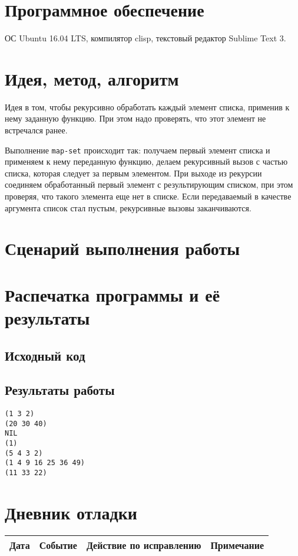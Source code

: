 \documentclass[12pt]{article}
\begin{document}
\section{Программное обеспечение}
ОС Ubuntu 16.04 LTS, компилятор clisp, текстовый редактор Sublime Text 3.

\section{Идея, метод, алгоритм}
Идея в том, чтобы рекурсивно обработать каждый элемент списка, применив к нему заданную функцию. При этом надо проверять, что этот элемент не встречался ранее.

Выполнение {\tt map-set} происходит так: получаем первый элемент списка и применяем к нему переданную функцию, делаем рекурсивный вызов с частью списка, которая следует за первым элементом. При выходе из рекурсии соединяем обработанный первый элемент с результирующим списком, при этом проверяя, что такого элемента еще нет в списке. Если передаваемый в качестве аргумента список стал пустым, рекурсивные вызовы заканчиваются.

\section{Сценарий выполнения работы}

\section{Распечатка программы и её результаты}

\subsection{Исходный код}


\subsection{Результаты работы}
\begin{lstlisting}
(1 3 2) 
(20 30 40) 
NIL 
(1) 
(5 4 3 2) 
(1 4 9 16 25 36 49)
(11 33 22)
\end{lstlisting}

\section{Дневник отладки}
\begin{tabular}{|p{50pt}|p{130pt}|p{130pt}|p{70pt}|}
\hline
Дата & Событие & Действие по исправлению & Примечание\\
\hline
\end{tabular}
\end{document}
